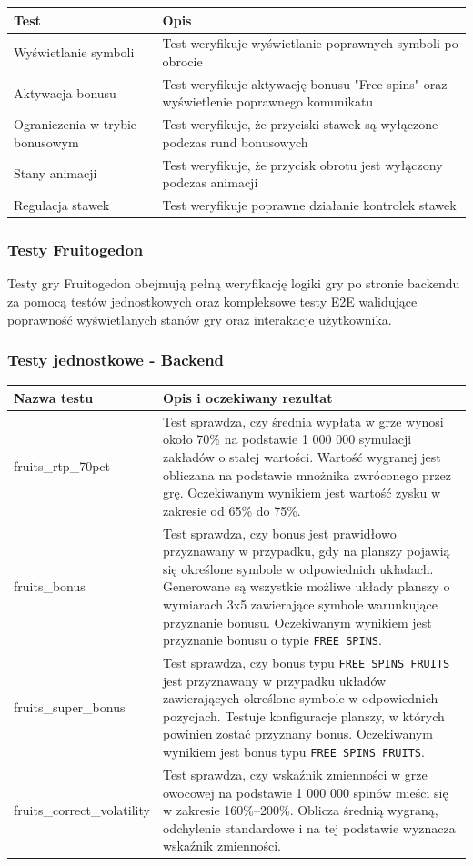 \documentclass[a4paper,12pt]{article}
\begin{document}
\begin{tabularx}{\textwidth}{lX}
\toprule
\textbf{Test} & \textbf{Opis} \\
\midrule
Wyświetlanie symboli & Test weryfikuje wyświetlanie poprawnych symboli po obrocie \\
Aktywacja bonusu & Test weryfikuje aktywację bonusu "Free spins" oraz wyświetlenie poprawnego komunikatu \\
Ograniczenia w trybie bonusowym & Test weryfikuje, że przyciski stawek są wyłączone podczas rund bonusowych \\
Stany animacji & Test weryfikuje, że przycisk obrotu jest wyłączony podczas animacji \\
Regulacja stawek & Test weryfikuje poprawne działanie kontrolek stawek \\
\bottomrule
\end{tabularx}


\subsubsection{Testy Fruitogedon}
Testy gry Fruitogedon obejmują pełną weryfikację logiki gry po stronie backendu za pomocą testów jednostkowych oraz kompleksowe testy E2E walidujące poprawność wyświetlanych stanów gry oraz interakacje użytkownika.

\subsubsection*{Testy jednostkowe - Backend}

\begin{tabularx}{\textwidth}{lX}
\toprule
\textbf{Nazwa testu} & \textbf{Opis i oczekiwany rezultat} \\
\midrule
fruits\_rtp\_70pct & Test sprawdza, czy średnia wypłata w grze wynosi około 70\% na podstawie 1 000 000 symulacji zakładów o stałej wartości. Wartość wygranej jest obliczana na podstawie mnożnika zwróconego przez grę. Oczekiwanym wynikiem jest wartość zysku w zakresie od 65\% do 75\%. \\
fruits\_bonus & Test sprawdza, czy bonus jest prawidłowo przyznawany w przypadku, gdy na planszy pojawią się określone symbole w odpowiednich układach. Generowane są wszystkie możliwe układy planszy o wymiarach 3x5 zawierające symbole warunkujące przyznanie bonusu. Oczekiwanym wynikiem jest przyznanie bonusu o typie \texttt{FREE SPINS}. \\
fruits\_super\_bonus & Test sprawdza, czy bonus typu \texttt{FREE SPINS FRUITS} jest przyznawany w przypadku układów zawierających określone symbole w odpowiednich pozycjach. Testuje konfiguracje planszy, w których powinien zostać przyznany bonus. Oczekiwanym wynikiem jest bonus typu \texttt{FREE SPINS FRUITS}. \\
fruits\_correct\_volatility & Test sprawdza, czy wskaźnik zmienności w grze owocowej na podstawie 1 000 000 spinów mieści się w zakresie 160\%–200\%. Oblicza średnią wygraną, odchylenie standardowe i na tej podstawie wyznacza wskaźnik zmienności. \\
\bottomrule
\end{tabularx}
\end{document}

